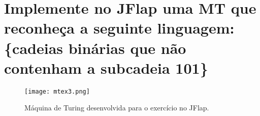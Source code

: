 \section{
    Implemente no JFlap uma MT que reconheça a seguinte linguagem: \{cadeias binárias que não contenham a subcadeia 101\}
    }

\setlength{\parindent}{4em}
\setlength{\parskip}{0.5em}
\renewcommand{\baselinestretch}{1}

\begin{figure}[h]
    \centering
    \texttt{[image: mtex3.png]}
    \caption{Máquina de Turing desenvolvida para o exercício no JFlap.}
    \label{fig:mtex3}
\end{figure}

\blindtext
